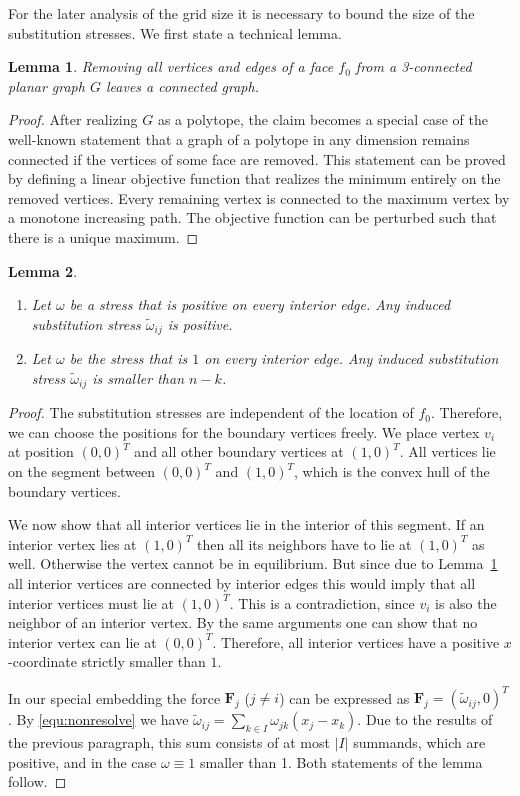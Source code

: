 \documentclass{article}
\theoremstyle{plain} \newtheorem{thm}{Theorem}[section]
\newtheorem{lem}{Lemma}[section]
\newcommand{\ot}{\tilde{\omega}}
\begin{document}
For the later analysis of the grid size it is necessary to bound the
size of the substitution stresses. We first state a technical lemma.
\begin{lem}\label{lem:technical}
  Removing all vertices and edges of a face $f_{0}$ from a 3-connected
  planar graph $G$ leaves a connected graph.
\end{lem}
\begin{proof}
  After realizing $G$ as a polytope, the
  claim becomes a special case of the well-known statement that a graph of a
  polytope in any dimension remains connected if the vertices of some
  face are removed. This statement can be proved by defining a linear
  objective function that realizes the minimum entirely on the removed
  vertices. Every remaining vertex is connected to the maximum vertex
  by a monotone increasing path.  The objective function
  can be perturbed such that there is a unique maximum.
\end{proof}
\begin{lem} \label{lem:2}
\begin{enumerate}
\item Let $\omega$ be a stress that is positive on every interior edge. Any induced substitution stress $\ot_{ij}$ is positive.
\item Let $\omega$ be the stress that is $1$ on every interior edge. Any induced substitution stress $\ot_{ij}$ is smaller than $n-k$.
\end{enumerate}
\end{lem}
\begin{proof}
The substitution stresses are independent of the location of $f_0$. 
Therefore, we can choose the positions for 
the boundary vertices freely.
We place vertex $v_i$ at position $(0,0)^T$ and all other boundary vertices at $(1,0)^T$.
All vertices lie on the segment between $(0,0)^T$ and $(1,0)^T$, which is the convex hull of the boundary vertices. 

We now show that all interior vertices lie in the interior of this
segment.
If an interior vertex lies at $(1,0)^T$ then all its neighbors have to lie at $(1,0)^T$ as well. Otherwise the vertex cannot be in equilibrium. But since due to Lemma~\ref{lem:technical} all interior vertices are connected by interior edges this would imply that all interior vertices must lie at $(1,0)^T$. This is a contradiction, since $v_{i}$ is also the neighbor of an interior vertex. By the same arguments one can show that no interior vertex can lie at $(0,0)^T$. 
Therefore, all interior vertices have a positive $x$-coordinate strictly smaller than $1$.

In our special embedding the force $\mathbf{F}_j$ ($j\not= i$) can be expressed as $\mathbf{F}_j=(\ot_{ij},0)^T$.
By \eqref{equ:nonresolve} we 
have $\ot_{ij}=\sum_{k \in I}\omega_{jk}(x_j-x_k)$. 
Due to the results of the previous paragraph, this sum consists of at most $|I|$  summands, which are positive, and in the case $\omega\equiv 1$ smaller than 1. Both statements of the lemma follow.
\end{proof}
\end{document}
